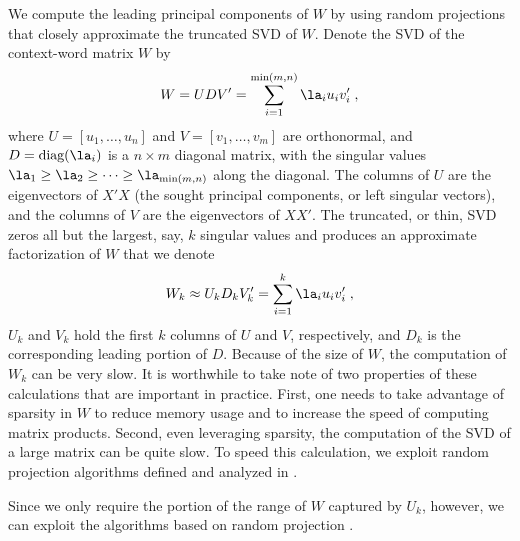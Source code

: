 \documentclass[12pt]{article}
\begin{document}
 
 We compute the leading principal components of $W$ by using random projections that
 closely approximate the truncated SVD of $W$.  Denote the SVD of the context-word matrix $W$ by
 \begin{equation}
       W = U D V' = \sum _{i=1}^{\min(m,n)} \la_i u_i v_i' \;,
 \end{equation}
 where $U = [u_1,\ldots,u_n]$ and $V=[v_1,\ldots,v_m]$ are orthonormal, and $D = \mbox{diag}(\la_i)$ is a $n \times m$ diagonal matrix,
 with the singular values $\la_1 \ge \la_2 \ge \cdots \ge \la_{\min(m,n)}$ along the diagonal.  The columns of $U$ are the eigenvectors of $X'X$ (the sought principal components,
 or left singular vectors), and the columns of $V$ are
 the eigenvectors of $XX'$.  The truncated, or thin, SVD zeros all but the
 largest, say, $k$ singular values and produces an approximate
 factorization of $W$ that we denote
 \begin{equation}
       W_k \approx U_k D_k V_k' = \sum _{i=1}^k \la_i u_i v_i' \;,
 \label{eq:Wk}
 \end{equation}
 $U_k$ and $V_k$ hold the first $k$ columns of $U$ and $V$, respectively, and $D_k$ is the corresponding leading portion of $D$.  Because of the size of $W$, the computation
 of $W_k$ can be very slow.  
 It is worthwhile to take note of two properties of these calculations that are
 important in practice.  First, one needs to take advantage of sparsity in  $W$ to reduce memory usage and to increase the speed of
 computing matrix products.  Second, even leveraging sparsity, the computation of the SVD of a large
 matrix can be quite slow. 
  To speed this calculation, we exploit random projection algorithms defined and
 analyzed in \citet{tropp10}.

Since we only require the portion of the range of $W$ captured by $U_k$, however, we can 
 exploit the algorithms based on random projection \citep{tropp10}.  
 
\end{document}
